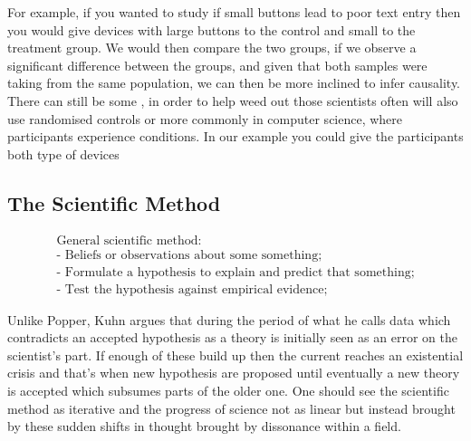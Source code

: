 {{{ 			


 			\par{For example, if you wanted to study if small buttons lead to poor text entry then you would give devices with large buttons to the control and small to the treatment group. We would then compare the two groups, if we observe a significant difference between the groups, and given that both samples were taking from the same population, we can then be more inclined to infer causality. There can still be some , in order to help weed out those scientists often will also use randomised controls or more commonly in computer science,  where participants experience  conditions}. In our example you could give the participants both type of devices}

 	\subsection{The Scientific Method}


 		$$\begin{array}{l}\text { General scientific method: } \\ \text { - Beliefs or observations about some something; } \\ \text { - Formulate a hypothesis to explain and predict that something; } \\ \text { - Test the hypothesis against empirical evidence; }\end{array}$$


 		\par{Unlike Popper, Kuhn argues that during the period of what he calls  data which contradicts an accepted hypothesis as a theory is initially seen as an error on the scientist's part. If enough of these build up then the current  reaches an existential crisis and that's when new hypothesis are proposed until eventually a new theory is accepted which subsumes parts of the older one. One should see the scientific method as iterative and the progress of science not as linear but instead brought by these sudden shifts in thought brought by dissonance within a field.}

}}
